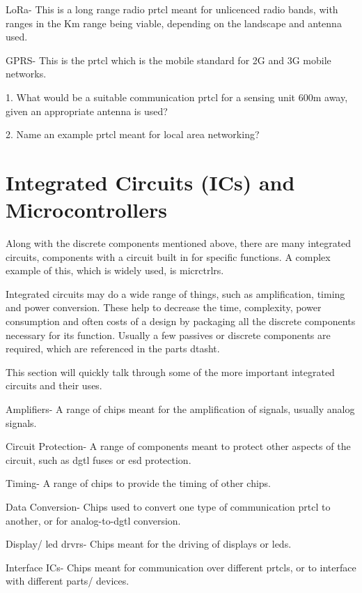 \documentclass[a4paper,11pt]{report}
\newcommand{\Quiz}[1] %
{
\par\noindent %
\phantomsection %
\todo[inline, color=blue!30]{\textbf{#1}} %
\vspace{1em} %
}
\begin{document}
LoRa- This is a long range radio \gls{prtcl} meant for unlicenced radio bands, with ranges in the Km range being viable, depending on the landscape and antenna used.

GPRS- This is the \gls{prtcl} which is the mobile standard for 2G and 3G mobile networks.

\Quiz{Quiz}

1. What would be a suitable communication \gls{prtcl} for a sensing unit 600m away, given an appropriate antenna is used?

2. Name an example \gls{prtcl} meant for local area networking?

\pagebreak

\section{Integrated Circuits (ICs) and Microcontrollers}

Along with the discrete components mentioned above, there are many integrated circuits, components with a circuit built in for specific functions. A complex example of this, which is widely used, is \gls{micrctrlr}s.

Integrated circuits may do a wide range of things, such as amplification, timing and power conversion. These help to decrease the time, complexity, power consumption and often costs of a design by packaging all the discrete components necessary for its function. Usually a few passives or discrete components are required, which are referenced in the parts \gls{dtasht}.

This section will quickly talk through some of the more important integrated circuits and their uses.

Amplifiers- A range of chips meant for the amplification of signals, usually analog signals.

Circuit Protection- A range of components meant to protect other aspects of the circuit, such as \gls{dgtl} fuses or \gls{esd} protection.

Timing- A range of chips to provide the timing of other chips.

Data Conversion- Chips used to convert one type of communication \gls{prtcl} to another, or for analog-to-\gls{dgtl} conversion.

Display/ \gls{led} \gls{drvr}s- Chips meant for the driving of displays or \gls{led}s.

Interface ICs- Chips meant for communication over different \gls{prtcl}s, or to interface with different parts/ devices.
\end{document}
